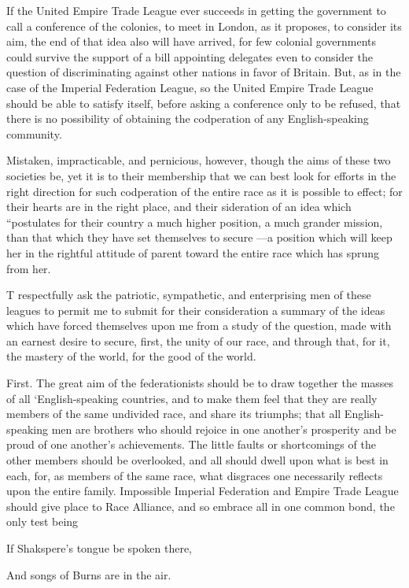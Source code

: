 \documentclass[11pt,openany]{book}
\begin{document}
If the United Empire Trade League ever succeeds in getting the government to call a conference of the colonies, to meet in London, as it proposes, to consider its aim, the end of that idea also will have arrived, for few colonial governments could survive the support of a bill appointing delegates even to consider the question of discriminating against other nations in favor of Britain. But, as in the case of the Imperial Federation League, so the United Empire Trade League should be able to satisfy itself, before asking a conference only to be refused, that there is no possibility of obtaining the codperation of any English-speaking community.

Mistaken, impracticable, and pernicious, however, though the aims of these two societies be, yet it is to their membership that we can best look for efforts in the right direction for such codperation of the entire race as it is possible to effect; for their hearts are in the right place, and their sideration of an idea which ``postulates for their country a much higher position, a much grander mission, than that which they have set themselves to secure ---a position which will keep her in the rightful attitude of parent toward the entire race which has sprung from her.

T respectfully ask the patriotic, sympathetic, and enterprising men of these leagues to permit me to submit for their consideration a summary of the ideas which have forced themselves upon me from a study of the question, made with an earnest desire to secure, first, the unity of our race, and through that, for it, the mastery of the world, for the good of the world.

First. The great aim of the federationists should be to draw together the masses of all `English-speaking countries, and to make them feel that they are really members of the same undivided race, and share its triumphs; that all English-speaking men are brothers who should rejoice in one another's prosperity and be proud of one another's achievements. The little faults or shortcomings of the other members should be overlooked, and all should dwell upon what is best in each, for, as members of the same race, what disgraces one necessarily reflects upon the entire family. Impossible Imperial Federation and Empire Trade League should give place to Race Alliance, and so embrace all in one common bond, the only test being

If Shakspere's tongue be spoken there,

And songs of Burns are in the air.
\end{document}
